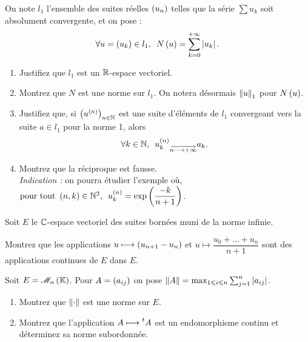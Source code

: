 \begin{corr}
\end{corr}

\begin{exopss}[Exercice 8]
On note \(l_1\) l'ensemble des suites réelles \(\left(u_n\right)\) telles que la série \(\sum u_k\) soit absolument convergente, et on pose : \[\quantifs{\forall u=\paren{u_k}\in l_1}N\paren{u}=\sum_{k=0}^{\pinf}\abs{u_k}.\]

\begin{enumerate}
    \item Justifiez que \(l_1\) est un \(\mathbb{R}\)-espace vectoriel. \\
    \item Montrez que \(N\) est une norme sur \(l_1\). On notera désormais \(\left\|u\right\|_1\) pour \(N\left(u\right)\). \\
    \item Justifiez que, si \(\left(u^{\left(n\right)}\right)_{n\in\mathbb{N}}\) est une suite d'éléments de \(l_1\) convergeant vers la suite \(a\in l_1\) pour la norme 1, alors \[\quantifs{\forall k\in\N}u_k\deriv{n}\tendqd{n\to\pinf}a_k.\]
    \item Montrez que la réciproque est fausse. \\ \textit{Indication :} on pourra étudier l'exemple où, \(\quantifs{\tpt\paren{n,k}\in\N^2}u_k\deriv{n}=\exp\paren{\dfrac{-k}{n+1}}\).
\end{enumerate}
\end{exopss}

\begin{corr}
\end{corr}

\begin{exops}[Exercice 9]
Soit \(E\) le \(\mathbb{C}\)-espace vectoriel des suites bornées muni de la norme infinie.

Montrez que les applications \(u\longmapsto\left(u_{n+1}-u_n\right)\) et \(u\mapsto\dfrac{u_0+\dots+u_n}{n+1}\) sont des applications continues de \(E\) dans \(E\).
\end{exops}

\begin{corr}
\end{corr}

\begin{exopss}[Exercice 10]
Soit \(E=\M{n}\). Pour \(A=\left(a_{ij}\right)\) on pose \(\left\|A\right\|=\max_{1\leqslant i\leqslant n}\sum_{j=1}^n\left\lvert a_{ij}\right\rvert\).

\begin{enumerate}
    \item Montrez que \(\left\|\cdot\right\|\) est une norme sur \(E\). \\
    \item Montrez que l'application \(A\longmapsto\prescript{t}{}{A}\) est un endomorphisme continu et déterminez sa norme subordonnée.
\end{enumerate}
\end{exopss}

